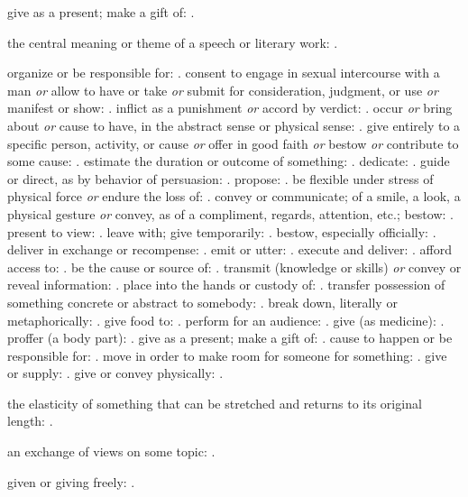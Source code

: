   give as a present; make a gift of: .

  the central meaning or theme of a speech or literary work: .

  organize or be responsible for: . consent to engage in sexual intercourse with a man \textit{or} allow to have or take \textit{or} submit for consideration, judgment, or use \textit{or} manifest or show: . inflict as a punishment \textit{or} accord by verdict: . occur \textit{or} bring about \textit{or} cause to have, in the abstract sense or physical sense: . give entirely to a specific person, activity, or cause \textit{or} offer in good faith \textit{or} bestow \textit{or} contribute to some cause: . estimate the duration or outcome of something: . dedicate: . guide or direct, as by behavior of persuasion: . propose: . be flexible under stress of physical force \textit{or} endure the loss of: . convey or communicate; of a smile, a look, a physical gesture \textit{or} convey, as of a compliment, regards, attention, etc.; bestow: . present to view: . leave with; give temporarily: . bestow, especially officially: . deliver in exchange or recompense: . emit or utter: . execute and deliver: . afford access to: . be the cause or source of: . transmit (knowledge or skills) \textit{or} convey or reveal information: . place into the hands or custody of: . transfer possession of something concrete or abstract to somebody: . break down, literally or metaphorically: . give food to: . perform for an audience: . give (as medicine): . proffer (a body part): . give as a present; make a gift of: . cause to happen or be responsible for: . move in order to make room for someone for something: . give or supply: . give or convey physically: .

  the elasticity of something that can be stretched and returns to its original length: .

  an exchange of views on some topic: .

  given or giving freely: .

